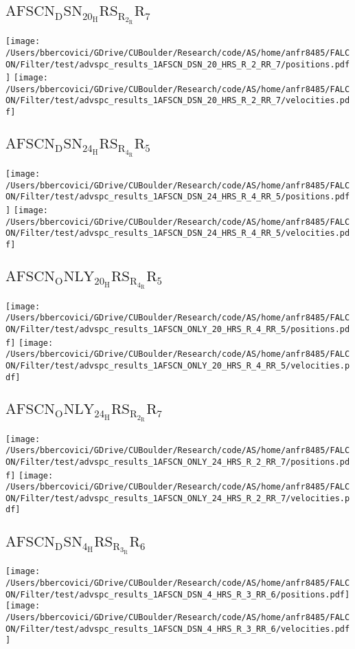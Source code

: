 \subsection{$\mathrm{AFSCN_DSN_20_HRS_R_2_RR_7}$}
\texttt{[image: /Users/bbercovici/GDrive/CUBoulder/Research/code/AS/home/anfr8485/FALCON/Filter/test/advspc\_results\_1AFSCN\_DSN\_20\_HRS\_R\_2\_RR\_7/positions.pdf]}
\texttt{[image: /Users/bbercovici/GDrive/CUBoulder/Research/code/AS/home/anfr8485/FALCON/Filter/test/advspc\_results\_1AFSCN\_DSN\_20\_HRS\_R\_2\_RR\_7/velocities.pdf]}
\subsection{$\mathrm{AFSCN_DSN_24_HRS_R_4_RR_5}$}
\texttt{[image: /Users/bbercovici/GDrive/CUBoulder/Research/code/AS/home/anfr8485/FALCON/Filter/test/advspc\_results\_1AFSCN\_DSN\_24\_HRS\_R\_4\_RR\_5/positions.pdf]}
\texttt{[image: /Users/bbercovici/GDrive/CUBoulder/Research/code/AS/home/anfr8485/FALCON/Filter/test/advspc\_results\_1AFSCN\_DSN\_24\_HRS\_R\_4\_RR\_5/velocities.pdf]}
\subsection{$\mathrm{AFSCN_ONLY_20_HRS_R_4_RR_5}$}
\texttt{[image: /Users/bbercovici/GDrive/CUBoulder/Research/code/AS/home/anfr8485/FALCON/Filter/test/advspc\_results\_1AFSCN\_ONLY\_20\_HRS\_R\_4\_RR\_5/positions.pdf]}
\texttt{[image: /Users/bbercovici/GDrive/CUBoulder/Research/code/AS/home/anfr8485/FALCON/Filter/test/advspc\_results\_1AFSCN\_ONLY\_20\_HRS\_R\_4\_RR\_5/velocities.pdf]}
\subsection{$\mathrm{AFSCN_ONLY_24_HRS_R_2_RR_7}$}
\texttt{[image: /Users/bbercovici/GDrive/CUBoulder/Research/code/AS/home/anfr8485/FALCON/Filter/test/advspc\_results\_1AFSCN\_ONLY\_24\_HRS\_R\_2\_RR\_7/positions.pdf]}
\texttt{[image: /Users/bbercovici/GDrive/CUBoulder/Research/code/AS/home/anfr8485/FALCON/Filter/test/advspc\_results\_1AFSCN\_ONLY\_24\_HRS\_R\_2\_RR\_7/velocities.pdf]}
\subsection{$\mathrm{AFSCN_DSN_4_HRS_R_3_RR_6}$}
\texttt{[image: /Users/bbercovici/GDrive/CUBoulder/Research/code/AS/home/anfr8485/FALCON/Filter/test/advspc\_results\_1AFSCN\_DSN\_4\_HRS\_R\_3\_RR\_6/positions.pdf]}
\texttt{[image: /Users/bbercovici/GDrive/CUBoulder/Research/code/AS/home/anfr8485/FALCON/Filter/test/advspc\_results\_1AFSCN\_DSN\_4\_HRS\_R\_3\_RR\_6/velocities.pdf]}
